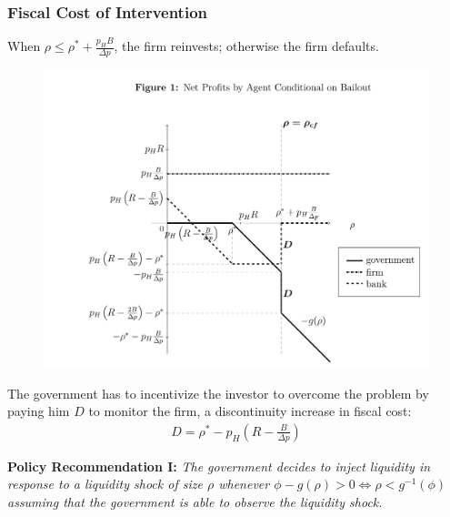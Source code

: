 \documentclass[13.8pt]{beamer}
\begin{document}
\begin{frame}
\frametitle{Fiscal Cost of Intervention}
When $\rho \leq \rho ^*+\frac{p_HB}{\Delta p}$, the firm reinvests; otherwise the firm defaults.

\begin{figure}
\includegraphics[scale=0.34]{utility1}
\end{figure} 

The government has to incentivize the investor to overcome the problem by paying him $D$ to monitor the firm, a discontinuity increase in fiscal cost:
\begin{align*}
D=\rho ^*-p_H(R-\frac{B}{\Delta p})  
\end{align*}
\par
\textbf{Policy Recommendation I:} \textit{The government decides to inject liquidity in response to a liquidity shock of size $\rho$ whenever $\phi-g(\rho)>0 \iff \rho<g^{-1}(\phi)$ assuming that the government is able to observe the liquidity shock.}
\end{frame}
\end{document}
